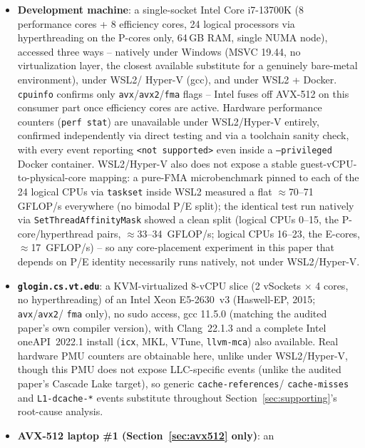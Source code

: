 \documentclass[acmsmall]{acmart}
\begin{document}
\begin{itemize}
  \item \textbf{Development machine}: a single-socket Intel Core
    i7-13700K (8 performance cores + 8 efficiency cores, 24 logical
    processors via hyperthreading on the P-cores only, 64\,GB RAM,
    single NUMA node), accessed three ways -- natively under Windows
    (MSVC 19.44, no virtualization layer, the closest available
    substitute for a genuinely bare-metal environment), under WSL2/
    Hyper-V (gcc), and under WSL2 + Docker. \texttt{cpuinfo} confirms
    only \texttt{avx}/\texttt{avx2}/\texttt{fma} flags -- Intel fuses
    off AVX-512 on this consumer part once efficiency cores are active.
    Hardware performance counters (\texttt{perf stat}) are unavailable
    under WSL2/Hyper-V entirely, confirmed independently via direct
    testing and via a toolchain sanity check, with every event
    reporting \texttt{<not supported>} even inside a
    \texttt{--privileged} Docker container. WSL2/Hyper-V also does not
    expose a stable guest-vCPU-to-physical-core mapping: a pure-FMA
    microbenchmark pinned to each of the 24 logical CPUs via
    \texttt{taskset} inside WSL2 measured a flat $\approx$70--71
    GFLOP/s everywhere (no bimodal P/E split); the identical test run
    natively via \texttt{SetThreadAffinityMask} showed a clean split
    (logical CPUs 0--15, the P-core/hyperthread pairs,
    $\approx$33--34~GFLOP/s; logical CPUs 16--23, the E-cores,
    $\approx$17~GFLOP/s) -- so any core-placement experiment in this
    paper that depends on P/E identity necessarily runs natively, not
    under WSL2/Hyper-V.
  \item \textbf{\texttt{glogin.cs.vt.edu}}: a KVM-virtualized 8-vCPU
    slice (2 vSockets $\times$ 4 cores, no hyperthreading) of an Intel
    Xeon E5-2630~v3 (Haswell-EP, 2015; \texttt{avx}/\texttt{avx2}/
    \texttt{fma} only), no sudo access, gcc 11.5.0 (matching the
    audited paper's own compiler version), with Clang~22.1.3 and a
    complete Intel oneAPI~2022.1 install (\texttt{icx}, MKL, VTune,
    \texttt{llvm-mca}) also available. Real hardware PMU counters are
    obtainable here, unlike under WSL2/Hyper-V, though this PMU does
    not expose LLC-specific events (unlike the audited paper's Cascade
    Lake target), so generic \texttt{cache-references}/
    \texttt{cache-misses} and \texttt{L1-dcache-*} events substitute
    throughout Section~\ref{sec:supporting}'s root-cause analysis.
  \item \textbf{AVX-512 laptop \#1 (Section~\ref{sec:avx512} only)}: an

\end{itemize}
\end{document}

